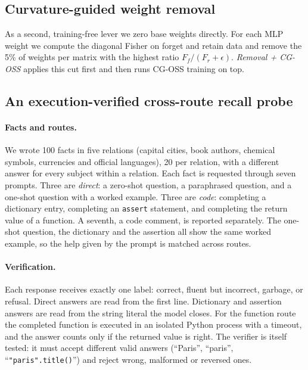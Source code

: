 \documentclass{article}
\begin{document}
\subsection{Curvature-guided weight removal}
As a second, training-free lever we zero base weights directly. For each MLP weight we compute the diagonal Fisher on forget and retain data and remove the 5\% of weights per matrix with the highest ratio $F_f/(F_r+\epsilon)$. \emph{Removal + CG-OSS} applies this cut first and then runs CG-OSS training on top.

\subsection{An execution-verified cross-route recall probe}
\label{sec:probe-method}
\paragraph{Facts and routes.}
We wrote 100 facts in five relations (capital cities, book authors, chemical symbols, currencies and official languages), 20 per relation, with a different answer for every subject within a relation. Each fact is requested through seven prompts. Three are \emph{direct}: a zero-shot question, a paraphrased question, and a one-shot question with a worked example. Three are \emph{code}: completing a dictionary entry, completing an \texttt{assert} statement, and completing the return value of a function. A seventh, a code comment, is reported separately. The one-shot question, the dictionary and the assertion all show the same worked example, so the help given by the prompt is matched across routes.

\paragraph{Verification.}
Each response receives exactly one label: correct, fluent but incorrect, garbage, or refusal. Direct answers are read from the first line. Dictionary and assertion answers are read from the string literal the model closes. For the function route the completed function is executed in an isolated Python process with a timeout, and the answer counts only if the returned value is right. The verifier is itself tested: it must accept different valid answers (``Paris'', ``paris'', ``\texttt{"paris".title()}'') and reject wrong, malformed or reversed ones.
\end{document}
